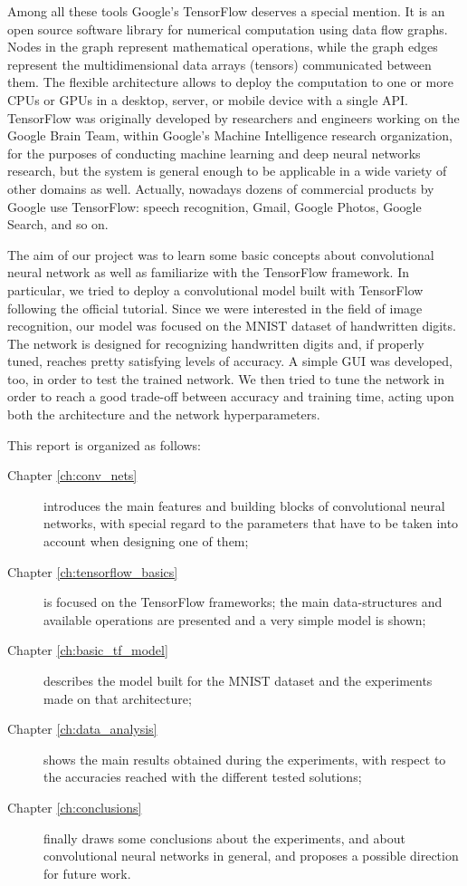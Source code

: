 Among all these tools Google's TensorFlow deserves a special mention.  It is an open source software library for numerical computation using data flow graphs. Nodes in the graph represent mathematical operations, while the graph edges represent the multidimensional data arrays (tensors) communicated between them. The flexible architecture allows to deploy the computation to one or more \acsp{CPU} or \acsp{GPU} in a desktop, server, or mobile device with a single API. TensorFlow was originally developed by researchers and engineers working on the Google Brain Team, within Google's Machine Intelligence research organization, for the purposes of conducting machine learning and deep neural networks research, but the system is general enough to be applicable in a wide variety of other domains as well. Actually, nowadays dozens of commercial products by Google use TensorFlow: speech recognition, Gmail, Google Photos, Google Search, and so on.

The aim of our project was to learn some basic concepts about convolutional neural network as well as familiarize with the TensorFlow framework. In particular, we tried to deploy a convolutional model built with TensorFlow following the official tutorial. Since we were interested in the field of image recognition, our model was focused on the MNIST dataset of handwritten digits. The network is designed for recognizing handwritten digits and, if properly tuned, reaches pretty satisfying levels of accuracy. A simple \ac{GUI} was developed, too, in order to test the trained network. We then tried to tune the network in order to reach a good trade-off between accuracy and training time, acting upon both the architecture and the network hyperparameters.

This report is organized as follows:

\begin{description}
	
	\item[Chapter \ref{ch:conv_nets}] introduces the main features and building blocks of convolutional neural networks, with special regard to the parameters that have to be taken into account when designing one of them;
	
	\item[Chapter \ref{ch:tensorflow_basics}] is focused on the TensorFlow frameworks; the main data-structures and available operations are presented and a very simple model is shown;
	
	\item[Chapter \ref{ch:basic_tf_model}] describes the model built for the MNIST dataset and the experiments made on that architecture;
	
	\item[Chapter \ref{ch:data_analysis}] shows the main results obtained during the experiments, with respect to the accuracies reached with the different tested solutions;
	
	\item[Chapter \ref{ch:conclusions}] finally draws some conclusions about the experiments, and about convolutional neural networks in general, and proposes a possible direction for future work.
	
\end{description}